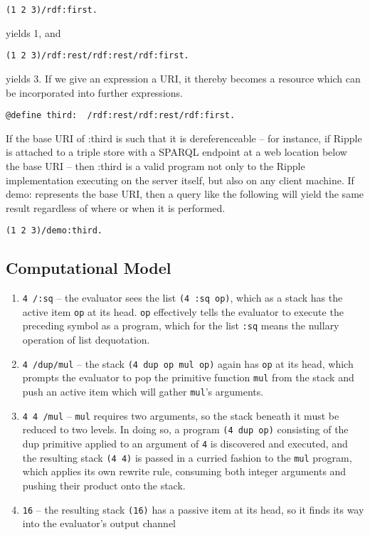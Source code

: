\documentclass[runningheads]{llncs}
\begin{document}
\begin{verbatim}
(1 2 3)/rdf:first.
\end{verbatim}

yields 1, and

\begin{verbatim}
(1 2 3)/rdf:rest/rdf:rest/rdf:first.
\end{verbatim}

yields 3.  If we give an expression a URI, it thereby becomes a resource which can be incorporated into further expressions.

\begin{verbatim}
@define third:  /rdf:rest/rdf:rest/rdf:first.
\end{verbatim}

If the base URI of :third is such that it is dereferenceable -- for instance, if Ripple is attached to a triple store with a SPARQL endpoint at a web location below the base URI -- then :third is a valid program not only to the Ripple implementation executing on the server itself, but also on any client machine.  If demo: represents the base URI, then a query like the following will yield the same result regardless of where or when it is performed.

\begin{verbatim}
(1 2 3)/demo:third.
\end{verbatim}

\subsection{Computational Model}



\begin{enumerate}
\item \texttt{4 /:sq} -- the evaluator sees the list \texttt{(4 :sq op)}, which as a stack has the active item \texttt{op} at its head.  \texttt{op} effectively tells the evaluator to execute the preceding symbol as a program, which for the list \texttt{:sq} means the nullary operation of list dequotation.
\item \texttt{4 /dup/mul} -- the stack \texttt{(4 dup op mul op)} again has \texttt{op} at its head, which prompts the evaluator to pop the primitive function \texttt{mul} from the stack and push an active item which will gather \texttt{mul}'s arguments.
\item \texttt{4 4 /mul} -- \texttt{mul} requires two arguments, so the stack beneath it must be reduced to two levels.  In doing so, a program \texttt{(4 dup op)} consisting of the dup primitive applied to an argument of \texttt{4} is discovered and executed, and the resulting stack \texttt{(4 4)} is passed in a curried fashion to the \texttt{mul} program, which applies its own rewrite rule, consuming both integer arguments and pushing their product onto the stack.
\item \texttt{16} -- the resulting stack \texttt{(16)} has a passive item at its head, so it finds its way into the evaluator's output channel
\end{enumerate}
\end{document}
